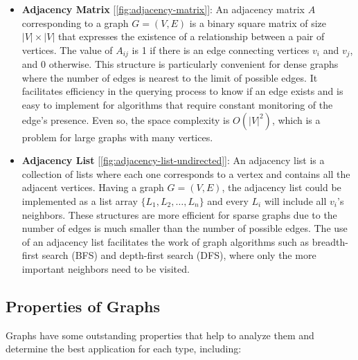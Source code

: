 \documentclass[../Thesis.tex]{subfiles}
\begin{document}
	\begin{itemize}
		\item \textbf{Adjacency Matrix} [\autoref{fig:adjacency-matrix}]: An adjacency matrix \( A \) corresponding to a graph \( G = (V, E) \) is a binary square matrix of size \( |V| \times |V| \)  that expresses the existence of a relationship between a pair of vertices. The value of \( A_{ij} \) is 1 if there is an edge connecting vertices \( v_i \) and \( v_j \), and 0 otherwise. This structure is particularly convenient for dense graphs where the number of edges is nearest to the limit of possible edges. It facilitates efficiency in the querying process to know if an edge exists and is easy to implement for algorithms that require constant monitoring of the edge's presence. Even so, the space complexity is \( O(|V|^2) \), which is a problem for large graphs with many vertices.
		
		
		\item \textbf{Adjacency List} [\autoref{fig:adjacency-list-undirected}]:  An adjacency list is a collection of lists where each one corresponds to a vertex and contains all the adjacent vertices. Having a graph  \( G = (V, E) \), the adjacency list could be implemented as a list array \( \{L_1, L_2, \ldots, L_n\} \) and every \( L_i \) will include all \( v_i \)'s neighbors. These structures are more efficient for sparse graphs due to the number of edges is much smaller than the number of possible edges. The use of an adjacency list facilitates the work of graph algorithms such as breadth-first search (BFS) and depth-first search (DFS), where only the more important neighbors need to be visited.
		
		
	\end{itemize}
	
	\subsection{Properties of Graphs}
	Graphs have some outstanding properties that help to analyze them and determine the best application for each type, including:
	
\end{document}
